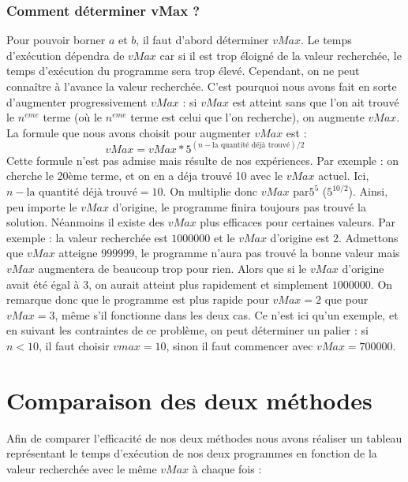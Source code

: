\documentclass{article}
\begin{document}
\section{Comment déterminer vMax ?}

Pour pouvoir borner $a$ et $b$, il faut d'abord déterminer $vMax$. Le temps d'exécution dépendra de $vMax$ car si il est trop éloigné de la valeur recherchée, le temps d'exécution du programme sera trop élevé. Cependant, on ne peut connaître à l'avance la valeur recherchée. C'est pourquoi nous avons fait en sorte d'augmenter progressivement $vMax$ : si $vMax$ est atteint sans que l'on ait trouvé le $n^{eme}$ terme (où le $n^{eme}$ terme est celui que l'on recherche), on augmente $vMax$. La formule que nous avons choisit pour augmenter $vMax$ est : \[vMax = vMax * 5^{(n - \text{la quantité déjà trouvé})/2}\] Cette formule n'est pas admise mais résulte de nos expériences. Par exemple : on cherche le 20ème terme, et on en a déja trouvé 10 avec le $vMax$ actuel. Ici, $n - \text{la quantité déjà trouvé} = 10$. On multiplie donc $vMax$ par$5^{5}$ ($5^{10/2}$). Ainsi, peu importe le $vMax$ d'origine, le programme finira toujours pas trouvé la solution. Néanmoins il existe des $vMax$ plus efficaces pour certaines valeurs. Par exemple : la valeur recherchée est $1 000 000$ et le $vMax$ d'origine est $2$. Admettons que $vMax$ atteigne $999 999$, le programme n'aura pas trouvé la bonne valeur mais $vMax$ augmentera de beaucoup trop pour rien. Alors que si le $vMax$ d'origine avait été égal à $3$, on aurait atteint plus rapidement et simplement $1 000 000$. On remarque donc que le programme est plus rapide pour $vMax = 2$ que pour $vMax = 3$, même s'il fonctionne dans les deux cas. Ce n'est ici qu'un exemple, et en suivant les contraintes de ce problème, on peut déterminer un palier : si $n < 10$, il faut choisir $vmax = 10$, sinon il faut commencer avec $vMax = 700 000$.

\newpage
\part{Comparaison des deux méthodes}
Afin de comparer l'efficacité de nos deux méthodes nous avons réaliser un tableau représentant le temps d'exécution de nos deux programmes en fonction de la valeur recherchée avec le même $vMax$ à chaque fois :
\end{document}

